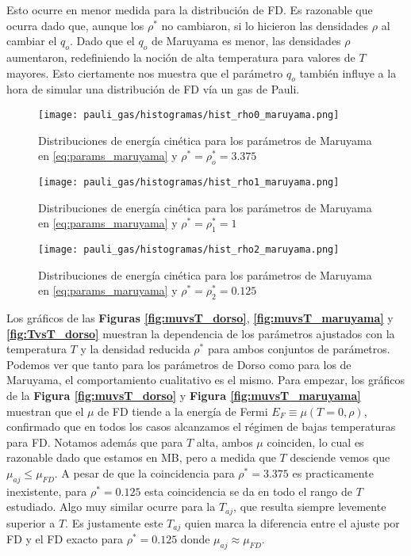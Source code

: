 Esto ocurre en menor medida para la distribución de FD.
Es razonable que ocurra dado que, aunque los $\rho^*$ no cambiaron, si lo hicieron las densidades $\rho$ al cambiar el $q_o$.
Dado que el $q_o$ de Maruyama es menor, las densidades $\rho$ aumentaron, redefiniendo la noción de alta temperatura para valores de $T$ mayores.
Esto ciertamente nos muestra que el parámetro $q_o$ también influye a la hora de simular una distribución de FD vía un gas de Pauli.
\begin{figure}[H]
	\centering
	\texttt{[image: pauli\_gas/histogramas/hist\_rho0\_maruyama.png]}
	\caption{Distribuciones de energía cinética para los parámetros de Maruyama en \eqref{eq:params_maruyama} y $\rho^* = \rho_o^* = 3.375$}
	\label{fig:hist_rho0_maruyama}
\end{figure}
\begin{figure}[H]
	\centering
	\texttt{[image: pauli\_gas/histogramas/hist\_rho1\_maruyama.png]}
	\caption{Distribuciones de energía cinética para los parámetros de Maruyama en \eqref{eq:params_maruyama} y $\rho^* = \rho_1^* = 1$}
	\label{fig:hist_rho1_maruyama}
\end{figure}
\begin{figure}[H]
	\centering
	\texttt{[image: pauli\_gas/histogramas/hist\_rho2\_maruyama.png]}
	\caption{Distribuciones de energía cinética para los parámetros de Maruyama en \eqref{eq:params_maruyama} y $\rho^* = \rho_2^* = 0.125$}
	\label{fig:hist_rho2_maruyama}
\end{figure}

Los gráficos de las \textbf{Figuras \ref{fig:muvsT_dorso}}, \textbf{\ref{fig:muvsT_maruyama}} y \textbf{\ref{fig:TvsT_dorso}} muestran la dependencia de los parámetros ajustados con la temperatura 
$T$ y la densidad reducida $\rho^*$ para ambos conjuntos de parámetros.
Podemos ver que tanto para los parámetros de Dorso como para los de Maruyama, el comportamiento cualitativo es el mismo.
Para empezar, los gráficos de la \textbf{Figura \ref{fig:muvsT_dorso}} y \textbf{Figura \ref{fig:muvsT_maruyama}} muestran que el $\mu$ de FD tiende a la energía de Fermi $E_F\equiv \mu(T=0,\rho)$, 
confirmado que en todos los casos alcanzamos el régimen de bajas temperaturas para FD.
Notamos además que para $T$ alta, ambos $\mu$ coinciden, lo cual es razonable dado que estamos en MB, pero a medida que $T$ desciende vemos que $\mu_{aj}\leq\mu_{FD}$.
A pesar de que la coincidencia para $\rho^*=3.375$ es practicamente inexistente, para $\rho^*=0.125$ esta coincidencia se da en todo el rango de $T$ estudiado.
Algo muy similar ocurre para la $T_{aj}$, que resulta siempre levemente superior a $T$.
Es justamente este $T_{aj}$ quien marca la diferencia entre el ajuste por FD y el FD exacto para $\rho^*=0.125$ donde $\mu_{aj}\approx\mu_{FD}$.

